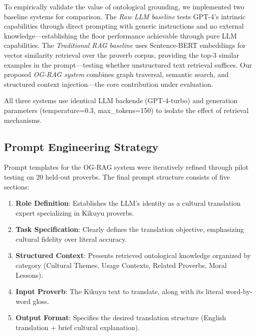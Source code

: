 To empirically validate the value of ontological grounding, we implemented two baseline systems for comparison. The \emph{Raw LLM baseline} tests GPT-4's intrinsic capabilities through direct prompting with generic instructions and no external knowledge—establishing the floor performance achievable through pure LLM capabilities. The \emph{Traditional RAG baseline} uses Sentence-BERT embeddings \cite{reimers2019sentence} for vector similarity retrieval over the proverb corpus, providing the top-3 similar examples in the prompt—testing whether unstructured text retrieval suffices. Our proposed \emph{OG-RAG system} combines graph traversal, semantic search, and structured context injection—the core contribution under evaluation.

All three systems use identical LLM backends (GPT-4-turbo) and generation parameters (temperature=0.3, max\_tokens=150) to isolate the effect of retrieval mechanisms.

\subsection{Prompt Engineering Strategy}
\label{subsec:prompt_engineering}

Prompt templates for the OG-RAG system were iteratively refined through pilot testing on 20 held-out proverbs. The final prompt structure consists of five sections:

\begin{enumerate}
    \item \textbf{Role Definition}: Establishes the LLM's identity as a cultural translation expert specializing in Kikuyu proverbs.
    
    \item \textbf{Task Specification}: Clearly defines the translation objective, emphasizing cultural fidelity over literal accuracy.
    
    \item \textbf{Structured Context}: Presents retrieved ontological knowledge organized by category (Cultural Themes, Usage Contexts, Related Proverbs, Moral Lessons).
    
    \item \textbf{Input Proverb}: The Kikuyu text to translate, along with its literal word-by-word gloss.
    
    \item \textbf{Output Format}: Specifies the desired translation structure (English translation + brief cultural explanation).
\end{enumerate}

